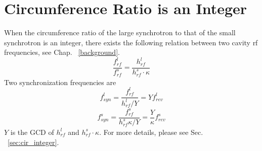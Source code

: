 % 									
%
%
%
% 
%
\section{Circumference Ratio is an Integer}
\label{sec:integ}
When the circumference ratio of the large synchrotron to that of the small synchrotron is an integer, there exists the following relation between two cavity rf frequencies, see Chap. ~\ref{background}. 
\begin{equation}
\frac{f_{\mathit{rf}}^{l}}{f_{\mathit{rf}}^{s}}= \frac{h^l_\mathit{rf}}{h^s_\mathit{rf} \cdot \kappa}\label{cir_int_1}
\end{equation}
Two synchronization frequencies are
\begin{equation}
f_{\mathit{syn}}^{l}=\frac{f_{\mathit{rf}}^{l}}{h^l_\mathit{rf}/Y}=Y f_{\mathit{rev}}^{l} \label{synch_freq1_r}
\end{equation}
\begin{equation}
f_{\mathit{syn}}^{s}=\frac{f_{\mathit{rf}}^{s}}{h^s_\mathit{rf}\kappa/Y}=\frac{Y}{\kappa} f_{\mathit{rev}}^{s} \label{synch_freq2_r}
\end{equation}
$Y$ is the \gls{GCD} of $h^l_\mathit{rf}$ and $h^s_\mathit{rf} \cdot \kappa$. For more details, please see Sec. ~\ref{sec:cir_integer}.

